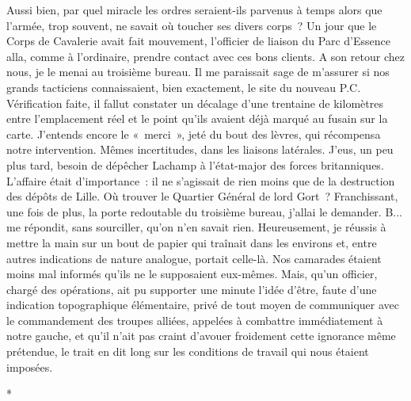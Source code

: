 \documentclass[french,twoside]{book} %
\begin{document}
Aussi bien, par quel miracle les ordres seraient-ils   parvenus à temps alors que l’armée, trop souvent, ne savait où toucher ses divers corps ? Un jour que le Corps de Cavalerie avait fait mouvement, l’officier de liaison du Parc d’Essence alla, comme à l’ordinaire, prendre contact avec ces bons clients. A son retour chez nous, je le menai au troisième bureau. Il me paraissait sage de m’assurer si nos grands tacticiens connaissaient, bien exactement, le site du nouveau P.C. Vérification faite, il fallut constater un décalage d’une trentaine de kilomètres entre l’emplacement réel et le point qu’ils avaient déjà marqué au fusain sur la carte. J’entends encore le « merci », jeté du bout des lèvres, qui récompensa notre intervention. Mêmes incertitudes, dans les liaisons latérales. J’eus, un peu plus tard, besoin de dépêcher Lachamp à l’état-major des forces britanniques. L’affaire était d’importance : il ne s’agissait de rien moins que de la destruction des dépôts de Lille. Où trouver le Quartier Général de lord Gort ? Franchissant, une fois de plus, la porte redoutable du troisième bureau, j’allai le demander. B... me répondit, sans sourciller, qu’on n’en savait rien. Heureusement, je réussis à mettre la main sur un bout de papier qui traînait dans les environs et, entre autres indications de nature analogue, portait celle-là. Nos camarades étaient moins mal informés qu’ils ne le supposaient eux-mêmes. Mais, qu’un officier, chargé des opérations, ait pu supporter une minute l’idée d’être, faute d’une indication topographique élémentaire, privé de tout moyen de communiquer avec le commandement des troupes alliées, appelées à combattre immédiatement à notre gauche, et qu’il n’ait pas craint d’avouer froidement cette ignorance même prétendue, le trait en dit long sur les conditions de travail qui nous étaient imposées.\par

\begin{center}
*\par
\end{center}
\end{document}
